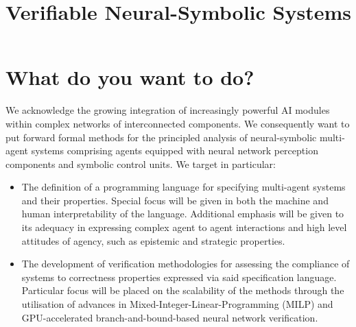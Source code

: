 \documentclass[11pt]{article}
\title{Verifiable Neural-Symbolic Systems}
\date{}
\begin{document}
\maketitle

\section{What do you want to do?}



We acknowledge the growing integration of increasingly
powerful AI modules within complex networks of
interconnected components. We consequently want to put
forward formal methods for the principled analysis of
neural-symbolic multi-agent systems comprising agents
equipped with neural network perception components and
symbolic control units. We target in particular:
\begin{itemize}
    \item  The definition of a programming language for
        specifying multi-agent systems and  their
        properties. Special focus will be given in both the
        machine and human interpretability of the language.
        Additional emphasis will be given to 
        its adequacy in expressing complex agent to
        agent interactions and high level attitudes of
        agency, such as epistemic and strategic properties.
    \item The development of  verification
        methodologies for assessing the compliance of
        systems  to correctness properties expressed via
        said specification language. Particular focus will
        be placed on the scalability of the methods through
        the utilisation of advances in
        Mixed-Integer-Linear-Programming (MILP) and
        GPU-accelerated branch-and-bound-based neural
        network verification.
\end{itemize}

\end{document}
